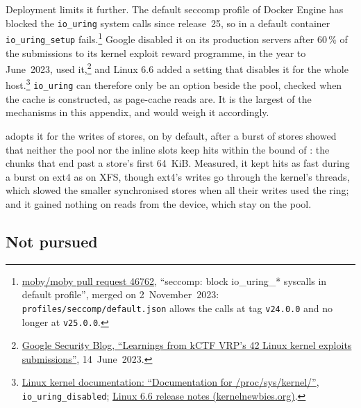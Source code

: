 Deployment limits it further. The default seccomp profile of Docker Engine
has blocked the \texttt{io\_uring} system calls since release~25, so in a
default container \texttt{io\_uring\_setup}
fails.\footnote{\href{https://github.com/moby/moby/pull/46762}{moby/moby
pull request 46762}, ``seccomp: block io\_uring\_* syscalls in default
profile'', merged on 2~November~2023: \texttt{profiles/seccomp/default.json}
allows the calls at tag \texttt{v24.0.0} and no longer at \texttt{v25.0.0}.}
Google disabled it on its production servers after 60\,\% of the
submissions to its kernel exploit reward programme, in the year to
June~2023, used
it,\footnote{\href{https://security.googleblog.com/2023/06/learnings-from-kctf-vrps-42-linux.html}{Google
Security Blog, ``Learnings from kCTF VRP's 42 Linux kernel exploits
submissions''}, 14~June~2023.} and Linux 6.6 added a setting that disables
it for the whole
host.\footnote{\href{https://www.kernel.org/doc/html/latest/admin-guide/sysctl/kernel.html\#io-uring-disabled}{Linux
kernel documentation: ``Documentation for /proc/sys/kernel/''},
\texttt{io\_uring\_disabled};
\href{https://kernelnewbies.org/Linux_6.6}{Linux 6.6 release notes
(kernelnewbies.org)}.} \texttt{io\_uring} can therefore only be an option
beside the pool, checked when the cache is constructed, as page-cache reads
are. It is the largest of the mechanisms in this appendix, and
 would weigh it accordingly.

 adopts it for the writes of stores, on by
default, after a burst of stores showed that neither the pool nor the
inline slots keep hits within the bound of
: the chunks that end past a store's
first 64~KiB. Measured, it kept hits as fast during a burst on ext4 as on
XFS, though ext4's writes go through the kernel's threads, which slowed the
smaller synchronised stores when all their writes used the ring; and it
gained nothing on reads from the device, which stay on the pool.

\subsection{Not pursued}
\label{app:executor-not-pursued}

